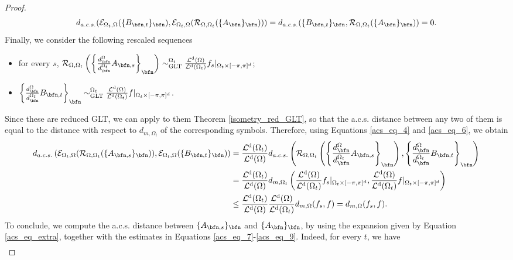 \documentclass{amsart}
\DeclareMathOperator{\Ld}{\mathcal{L}^d}
\begin{document}
\begin{proof}
   \begin{equation}\label{acs_eq_8}
       d_{a.c.s.}(\mathcal{E}_{\Omega_t,\Omega}(\{B_{\bfn,t}\}_\bfn),\mathcal{E}_{\Omega_t,\Omega}(\mathcal{R}_{\Omega,\Omega_t}(\{A_\bfn\}_\bfn)))=d_{a.c.s.}(\{B_{\bfn,t}\}_\bfn,\mathcal{R}_{\Omega,\Omega_t}(\{A_\bfn\}_\bfn))=0.
   \end{equation}
   Finally, we consider the following rescaled sequences 
   \begin{itemize}
       \item for every $s$, $\mathcal{R}_{\Omega,\Omega_t}\left(\left\{\frac{d_\bfn^{\Omega}}{d_\bfn^{\Omega_t}}A_{\bfn,s}\right\}_\bfn\right)\sim_{\mathrm{GLT}}^{\Omega_t}\frac{\Ld(\Omega)}{\Ld(\Omega_t)}f_s|_{\Omega_t\times[-\pi,\pi]^d}$;
       \item $\left\{\frac{d_\bfn^{\Omega}}{d_\bfn^{\Omega_t}}B_{\bfn,t}\right\}_\bfn\sim_{\mathrm{GLT}}^{\Omega_t}\frac{\Ld(\Omega)}{\Ld(\Omega_t)}f|_{\Omega_t\times[-\pi,\pi]^d}$.
   \end{itemize}
   Since these are reduced GLT, we can apply to them Theorem \ref{isometry_red_GLT}, so that the a.c.s. distance between any two of them is equal to the distance with respect to $d_{m,\Omega_t}$ of the corresponding symbols. 
   Therefore, using Equations \eqref{acs_eq_4} and \eqref{acs_eq_6}, we obtain 
   \begin{align}\label{acs_eq_9}
       \nonumber d_{a.c.s.}\left(\mathcal{E}_{\Omega_t,\Omega}(\mathcal{R}_{\Omega,\Omega_t}(\{A_{\bfn,s}\}_\bfn)),\mathcal{E}_{\Omega_t,\Omega}(\{B_{\bfn,t}\}_\bfn)\right)&=\frac{\Ld(\Omega_t)}{\Ld(\Omega)}d_{a.c.s.}\left(\mathcal{R}_{\Omega,\Omega_t}\left(\left\{\frac{d_\bfn^{\Omega}}{d_\bfn^{\Omega_t}}A_{\bfn,s}\right\}_\bfn\right),\left\{\frac{d_\bfn^{\Omega}}{d_\bfn^{\Omega_t}}B_{\bfn,t}\right\}_\bfn\right)\\
         &=\frac{\Ld(\Omega_t)}{\Ld(\Omega)}d_{m,\Omega_t}\left(\frac{\Ld(\Omega)}{\Ld(\Omega_t)}f_s|_{\Omega_t\times[-\pi,\pi]^d},\frac{\Ld(\Omega)}{\Ld(\Omega_t)}f|_{\Omega_t\times[-\pi,\pi]^d}\right)\\
        \nonumber &\leq \frac{\Ld(\Omega_t)}{\Ld(\Omega)}\frac{\Ld(\Omega)}{\Ld(\Omega_t)}d_{m,\Omega}(f_s,f)=d_{m,\Omega}(f_s,f).
   \end{align}
   To conclude, we compute the a.c.s. distance between $\{A_{\bfn,s}\}_\bfn$ and $\{A_\bfn\}_\bfn$, by using the expansion given by Equation \eqref{acs_eq_extra}, together with the estimates in Equations \eqref{acs_eq_7}-\eqref{acs_eq_9}. Indeed, for every $t$, we have 
   \begin{align}\label{acs_eq_10}

\end{align}
\end{proof}
\end{document}
